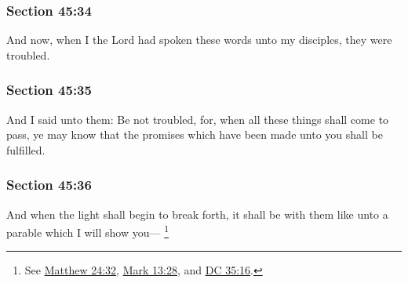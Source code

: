 	\subsubsection{Section 45:34} %
		\label{DC45-34}

		And now, when I the Lord had spoken these words unto my disciples, they were troubled.


	\subsubsection{Section 45:35} %
		\label{DC45-35}

		And I said unto them: Be not troubled, for, when all these things shall come to pass, ye may know that the promises which have been made unto you shall be fulfilled.


	\subsubsection{Section 45:36} %
		\label{DC45-36}

		And when the light shall begin to break forth, it shall be with them like unto a parable which I will show you---%
			\footnote{%
				See \hyperref[MATTHEW-24-32]{Matthew 24:32}, \hyperref[MARK-13-28]{Mark 13:28}, and \hyperref[DC35-16]{DC 35:16}.
				}


